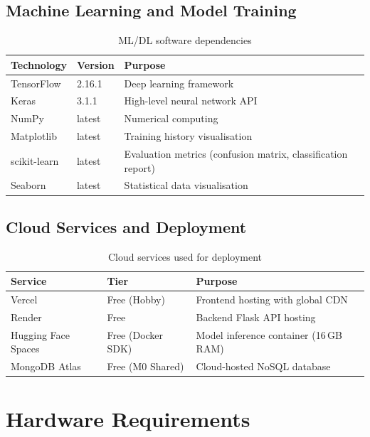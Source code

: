 \documentclass[12pt, a4paper, oneside]{report}
\begin{document}
\subsection{Machine Learning and Model Training}

\begin{table}[H]
\centering
\caption{ML/DL software dependencies}
\label{tab:ml_deps}
\begin{tabular}{llp{7cm}}
\toprule
\textbf{Technology} & \textbf{Version} & \textbf{Purpose} \\
\midrule
TensorFlow & 2.16.1 & Deep learning framework \\
Keras & 3.1.1 & High-level neural network API \\
NumPy & latest & Numerical computing \\
Matplotlib & latest & Training history visualisation \\
scikit-learn & latest & Evaluation metrics (confusion matrix, classification report) \\
Seaborn & latest & Statistical data visualisation \\
\bottomrule
\end{tabular}
\end{table}

\subsection{Cloud Services and Deployment}

\begin{table}[H]
\centering
\caption{Cloud services used for deployment}
\label{tab:cloud_services}
\begin{tabular}{lp{4cm}p{6cm}}
\toprule
\textbf{Service} & \textbf{Tier} & \textbf{Purpose} \\
\midrule
Vercel & Free (Hobby) & Frontend hosting with global CDN \\
Render & Free & Backend Flask API hosting \\
Hugging Face Spaces & Free (Docker SDK) & Model inference container (16\,GB RAM) \\
MongoDB Atlas & Free (M0 Shared) & Cloud-hosted NoSQL database \\
\bottomrule
\end{tabular}
\end{table}

\section{Hardware Requirements}
\label{sec:hardware_req}
\end{document}

